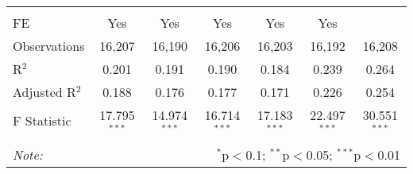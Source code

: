 \begin{table}[!htbp]
\begin{tabular}{@{\extracolsep{5pt}}lcccccc}
\hline \\[-1.8ex] 
FE & Yes & Yes & Yes & Yes & Yes &  \\ 
Observations & 16,207 & 16,190 & 16,206 & 16,203 & 16,192 & 16,208 \\ 
R$^{2}$ & 0.201 & 0.191 & 0.190 & 0.184 & 0.239 & 0.264 \\ 
Adjusted R$^{2}$ & 0.188 & 0.176 & 0.177 & 0.171 & 0.226 & 0.254 \\ 
F Statistic & 17.795$^{***}$ & 14.974$^{***}$ & 16.714$^{***}$ & 17.183$^{***}$ & 22.497$^{***}$ & 30.551$^{***}$ \\ 
\hline 
\hline \\[-1.8ex] 
\textit{Note:}  & \multicolumn{6}{r}{$^{*}$p$<$0.1; $^{**}$p$<$0.05; $^{***}$p$<$0.01} \\ 
\end{tabular} 
\end{table} 
